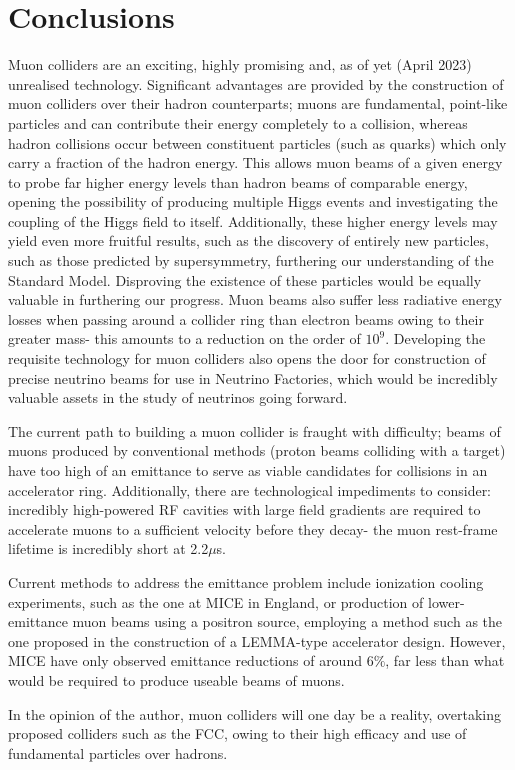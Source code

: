 \documentclass{article}
\begin{document}
	
	\section{Conclusions}
	
	\par Muon colliders are an exciting, highly promising and, as of yet (April 2023) unrealised technology. Significant advantages are provided by the construction of muon colliders over their hadron counterparts; muons are fundamental, point-like particles and can contribute their energy completely to a collision, whereas hadron collisions occur between constituent particles (such as quarks) which only carry a fraction of the hadron energy. This allows muon beams of a given energy to probe far higher energy levels than hadron beams of comparable energy, opening the possibility of producing multiple Higgs events and investigating the coupling of the Higgs field to itself. Additionally, these higher energy levels may yield even more fruitful results, such as the discovery of entirely new particles, such as those predicted by supersymmetry, furthering our understanding of the Standard Model. Disproving the existence of these particles would be equally valuable in furthering our progress. Muon beams also suffer less radiative energy losses when passing around a collider ring than electron beams owing to their greater mass- this amounts to a reduction on the order of $10^9$. Developing the requisite technology for muon colliders also opens the door for construction of precise neutrino beams for use in Neutrino Factories, which would be incredibly valuable assets in the study of neutrinos going forward.
	\par The current path to building a muon collider is fraught with difficulty; beams of muons produced by conventional methods (proton beams colliding with a target) have too high of an emittance to serve as viable candidates for collisions in an accelerator ring. Additionally, there are technological impediments to consider: incredibly high-powered RF cavities with large field gradients are required to accelerate muons to a sufficient velocity before they decay- the muon rest-frame lifetime is incredibly short at 2.2$\mu$s. 
	\par Current methods to address the emittance problem include ionization cooling experiments, such as the one at MICE in England, or production of lower-emittance muon beams using a positron source, employing a method such as the one proposed in the construction of a LEMMA-type accelerator design. However, MICE have only observed emittance reductions of around 6$\%$, far less than what would be required to produce useable beams of muons.
	\par In the opinion of the author, muon colliders will one day be a reality, overtaking proposed colliders such as the FCC, owing to their high efficacy and use of fundamental particles over hadrons.
	
\end{document}
